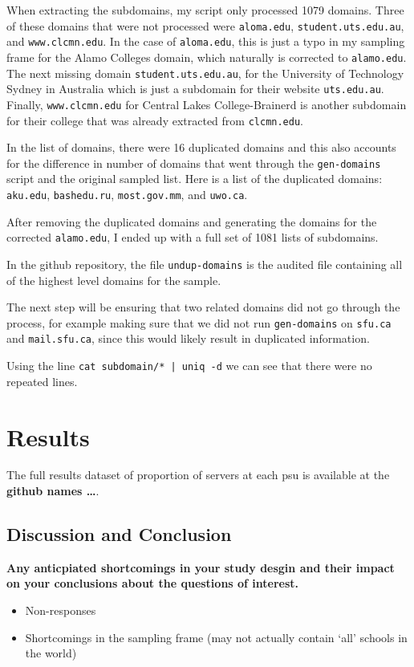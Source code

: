 \documentclass{article}
\theoremstyle{definition}
\begin{document}
\begin{flushleft}
When extracting the subdomains, my script only processed 1079 domains.
Three of these domains that were not processed were \texttt{aloma.edu},
\texttt{student.uts.edu.au}, and \texttt{www.clcmn.edu}. In the case of
\texttt{aloma.edu}, this is just a typo in my sampling frame for the
Alamo Colleges domain, which naturally is corrected to \texttt{alamo.edu}.
The next missing domain \texttt{student.uts.edu.au}, for the University
of Technology Sydney in Australia which is just a subdomain for their
website \texttt{uts.edu.au}. Finally, \texttt{www.clcmn.edu} for
Central Lakes College-Brainerd is another subdomain for their college
that was already extracted from \texttt{clcmn.edu}.

In the list of domains, there were 16 duplicated domains and this
also accounts for the difference in number of domains that went
through the \texttt{gen-domains} script and the original sampled
list. Here is a list of the duplicated domains: \texttt{aku.edu},
\texttt{bashedu.ru}, \texttt{most.gov.mm}, and \texttt{uwo.ca}.

After removing the duplicated domains and generating the domains
for the corrected \texttt{alamo.edu}, I ended up with a full set
of 1081 lists of subdomains.

In the github repository, the file \texttt{undup-domains} is the audited file containing all
of the highest level domains for the sample.

The next step will be ensuring that two related domains did not go through
the process, for example making sure that we did not run \texttt{gen-domains}
on \texttt{sfu.ca} and \texttt{mail.sfu.ca}, since this would likely result in
duplicated information.

Using the line \texttt{cat subdomain/* | uniq -d} we can see that
there were no repeated lines.




\section{Results}
The full results dataset of proportion of servers at
each psu is available at the \textbf{github names \dots}.


\subsection{Discussion and Conclusion}
\textbf{Any anticpiated shortcomings in your study desgin
and their impact on your conclusions about the questions
of interest.}
\begin{itemize}
\item Non-responses
\item Shortcomings in the sampling frame (may not actually contain `all' schools in the world)
\end{itemize}




\end{flushleft}
\end{document}
